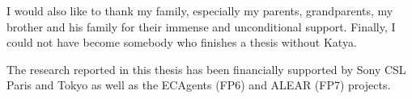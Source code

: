 I would also like to thank my family, especially my
parents, grandparents, my brother and his family for
their immense and unconditional support. 
Finally, I could not have become somebody
who finishes a thesis without Katya.

The research reported in this thesis has been financially supported 
by Sony CSL Paris and Tokyo as well as the ECAgents (FP6) and 
ALEAR (FP7) projects.